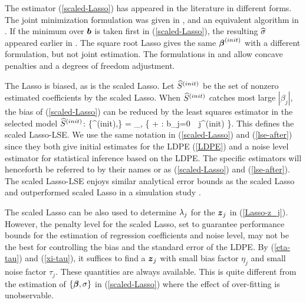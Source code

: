 \documentclass[11pt]{amsart}
\def\argmin{\mathop{\rm arg\, min}}
\begin{document}
The estimator (\ref{scaled-Lasso}) has appeared in the literature in different forms. 
The joint minimization formulation was given in \cite{Antoniadis10}, 
and an equivalent algorithm in \cite{SunZ10}.
If the minimum over $\boldsymbol{b}$ is taken first in (\ref{scaled-Lasso}), 
the resulting $\widehat{\sigma}$ appeared earlier in \cite{Zhang10-mc+}. 
The square root Lasso \cite{BelloniCW11} gives the same $\boldsymbol{\beta}^{(init)}$ with a different formulation, 
but not joint estimation. The formulations in \cite{Zhang10-mc+} and \cite{SunZ10} allow concave 
penalties and a degrees of freedom adjustment. 

The Lasso is biased, as is the scaled Lasso. 
Let $\widehat{S}^{(init)}$ be the set of nonzero estimated coefficients by the scaled Lasso. 
When $\widehat{S}^{(init)}$ catches most large {$|\beta_j|$}, the bias of (\ref{scaled-Lasso}) can be reduced 
by the least squares estimator in the selected model $\widehat{S}^{(init)}$: 
\big\{\hbbeta^{(init)},\hsigma\big\} = \argmin_{\bb,\sigma}
\Big\{ + : 
b_j=0\ \forall\ j\not\in\Shat^{(init)} \Big\}. 
\eel
This defines the {scaled Lasso-LSE}. 
We use the same notation in (\ref{scaled-Lasso}) and (\ref{lse-after}) since they both give 
initial estimates for the LDPE (\ref{LDPE}) and a noise level estimator for statistical inference based on 
the LDPE. The specific estimators will henceforth be referred to by their names or 
as (\ref{scaled-Lasso}) and (\ref{lse-after}).  
The {scaled Lasso-LSE} enjoys similar analytical error bounds as the scaled Lasso and outperformed 
scaled Lasso in a simulation study \cite{SunZ11}. 

The scaled Lasso can be also used to determine $\lambda_j$ for the $\boldsymbol{z}_j$ in (\ref{Lasso-z_j}). 
However, the penalty level for the scaled Lasso, set to guarantee performance bounds for the 
estimation of regression coefficients and noise level, may not be the best for 
controlling the bias and the standard error of the LDPE. 
By  (\ref{eta-tau}) and (\ref{xi-tau}), it suffices to find a $\boldsymbol{z}_j$ with small bias factor 
$\eta_j$ and small noise factor $\tau_j$. These quantities are always available. 
This is quite different from the estimation of $\{\boldsymbol{\beta},\sigma\}$ in (\ref{scaled-Lasso}) 
where the effect of over-fitting is unobservable. 
\end{document}
